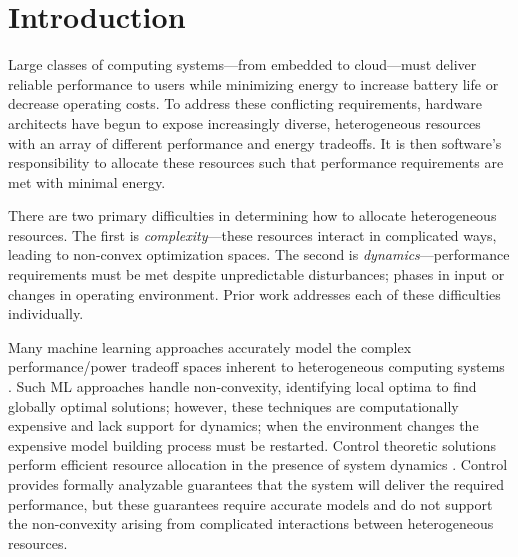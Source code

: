 \section{Introduction}
Large classes of computing systems---from embedded to cloud---must
deliver reliable performance to users while minimizing energy to
increase battery life or decrease operating costs.  To address these
conflicting requirements, hardware architects have begun to expose
increasingly diverse, heterogeneous resources with an array of
different performance and energy tradeoffs.  It is then software's
responsibility to allocate these resources such that performance
requirements are met with minimal energy.


There are two primary difficulties in determining how to allocate
heterogeneous resources.  The first is \emph{complexity}---these
resources interact in complicated ways, leading to non-convex
optimization spaces.  The second is \emph{dynamics}---perfor\-mance
requirements must be met despite unpredictable disturbances; \eg{}
phases in input or changes in operating environment.  Prior work
addresses each of these difficulties individually.

Many machine learning approaches accurately model the complex
performance/power tradeoff spaces inherent to heterogeneous computing
systems
\cite{reddiHPCA2013,dubach2010,Bitirgen2008,Ipek,Koala,LEO,Flicker,Ponamarev}.
Such ML approaches handle non-convexity, identifying local optima to
find globally optimal solutions; however, these techniques are
computationally expensive and lack support for dynamics; \ie{} when
the environment changes the expensive model building process must be
restarted.  Control theoretic solutions perform efficient resource
allocation in the presence of system dynamics
\cite{Hellerstein2004a,Chen2011,PTRADE,POET,ControlWare,Agilos,grace2}.
Control provides formally analyzable guarantees that the system will
deliver the required performance, but these guarantees require
accurate models and do not support the non-convexity arising from
complicated interactions between heterogeneous resources.


